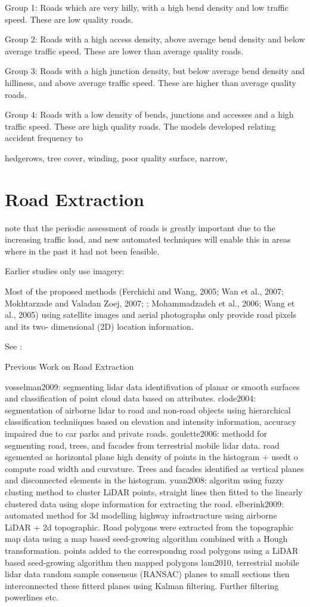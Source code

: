 \begin{multicols}{2}
Group 1: Roads which are very hilly, with a high bend
density and low traffic speed. These are low
quality roads.

Group 2: Roads with a high access density, above average
bend density and below average traffic speed.
These are lower than average quality roads.

Group 3: Roads with a high junction density, but below
average bend density and hilliness, and above
average traffic speed. These are higher than
average quality roads.

Group 4: Roads with a low density of bends, junctions
and accesses and a high traffic speed. These are
high quality roads.
The models developed relating accident frequency to

hedgerows, tree cover, winding, poor quality surface, narrow, 

\section{Road Extraction}

\cite{yadev2018} note that the periodic assessment of roads is greatly important due to the increasing traffic load, and new automated techniques will enable this in areas where in the past it had not been feasible.


Earlier studies only use imagery:

Most of the proposed methods (Ferchichi and Wang, 2005; Wan et al., 2007; Mokhtarzade and Valadan Zoej, 2007; \citep{mena2005}; Mohammadzadeh et al., 2006; Wang et al., 2005) using satellite images and aerial photographs only provide road pixels and its two- dimensional (2D) location information.

See \citep{kumar2013}:

Previous Work on Road Extraction

vosselman2009: segmenting lidar data identifivation of planar or smooth surfaces and classification of point cloud data based on attributes.
clode2004: segmentation of airborne lidar to road and non-road objects using hierarchical classification techniiques based on elevation and intensity information, accuracy impaired due to car parks and private roads.
goulette2006: methodd for segmenting road, trees, and facades from terrestrial mobile lidar data. road sgemented as horizontal plane high density of points in the histogram + usedt o compute road width and curvature. Trees and facades identified as vertical planes and disconnected elements in the histogram.
yuan2008: algoritm using fuzzy clusting method to cluster LiDAR points, straight lines then fitted to the linearly clustered data using slope information for extracting the road.
elberink2009: automated method for 3d modelling highway infrastructure using airborne LiDAR + 2d topographic. Road polygons were extracted from the topographic map data using a map based seed-growing algorithm combined with a Hough transformation. points added to the correspondng road polygons using a LiDAR based seed-growing algorithm then mapped polygons
lam2010, terrestrial mobile lidar data random sample consensus (RANSAC) planes to small sections then interconnected these fitterd planes using Kalman filtering. Further filtering powerlines etc.


\end{multicols}
